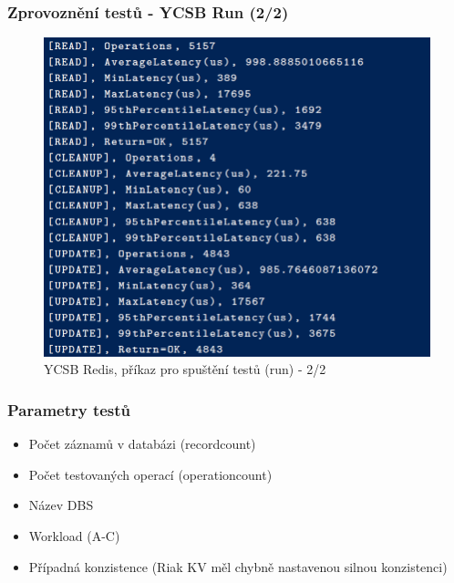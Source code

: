 \documentclass{beamer}
\begin{document}
	\begin{frame}
		\frametitle{Zprovoznění testů - YCSB Run (2/2)}
		\begin{figure}
			\centering
			\includegraphics[scale=0.35]{Figures/ycsb_run_2.PNG}
			\caption{YCSB Redis, příkaz pro spuštění testů (run) - 2/2}
		\end{figure}
	\end{frame}
	
	\begin{frame}
		\frametitle{Parametry testů}
		\begin{itemize}
			\item Počet záznamů v databázi (recordcount)
			\item Počet testovaných operací (operationcount)
			\item Název DBS
			\item Workload (A-C)
			\item Případná konzistence (Riak KV měl chybně nastavenou silnou konzistenci)
		\end{itemize}
	\end{frame}
	
\end{document}
